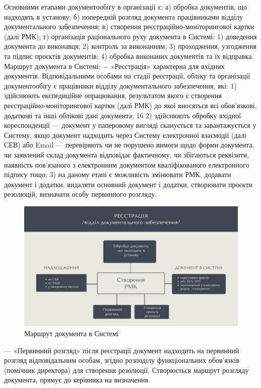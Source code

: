Основними етапами документообігу в організації є:
а) обробка документів, що надходять в установу;
б) попередній розгляд документа працівниками відділу документального
забезпечення;
в) створення реєстраційно-моніторингової картки (далі РМК);
г) організація раціонального руху документа в Системі:
1) доведення документа до виконавця;
2) контроль за виконанням;
3) проходження, узгодження та підпис проєктів документів;
4) обробка виконаних документів та їх відправка.
Маршрут документа в Системі:
− «Реєстрація» характерна для вхідних документів. Відповідальними
особами на стадії реєстрації, обліку та організації документообігу є
працівники відділу документального забезпечення, які:
1) здійснюють експедиційне опрацювання, результатом якого є створення
реєстраційно-моніторингової картки (далі РМК) до якої вносяться всі
обов’язкові, додаткові та інші облікові дані документа;
16
2) здійснюють обробку вхідної кореспонденції --- документ у паперовому
вигляді сканується та завантажується у Систему, якщо документ надходить
через Систему електронної взаємодії (далі СЕВ) або Email --- перевіряють чи
не порушено вимоги щодо форми документа, чи заявлений склад документа
відповідає фактичному, чи збігаються реквізити, наявність пов’язаного з
електронним документом кваліфікованого електронного підпису тощо;
3) на даному етапі є можливість змінювати РМК, додавати документ і додатки,
видаляти основний документ і додатки, створювати проєкти резолюцій,
визначати особу первинного розгляду.

\begin{figure}[!htbp]
\centerline{\includegraphics[width=\textwidth]{img/4.4.1.png}}
\caption{Маршрут документа в Системі}
\end{figure}

--- «Первинний розгляд» після реєстрації документ надходить на первинний
розгляд відповідальним особам, згідно розподілу функціональних
обов’язків (помічник директора) для створення резолюції. Створюється
маршрут розгляду документа, прямує до керівника на визначення.

